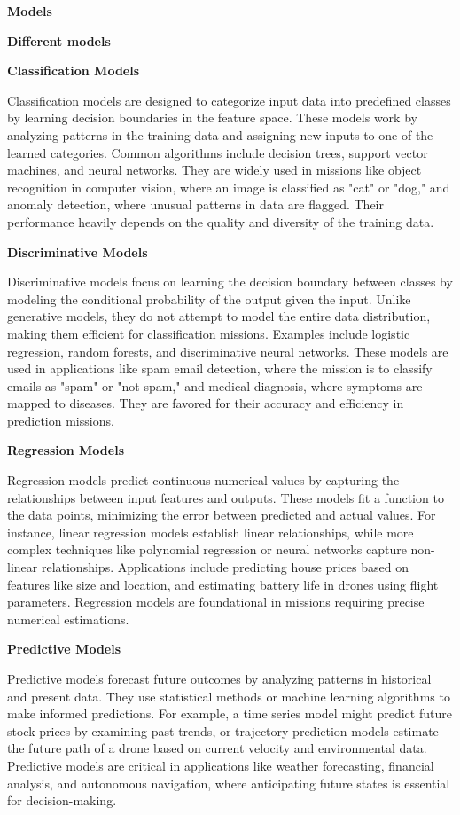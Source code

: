 \documentclass{book}
\providecommand{\ProjectDeepHeading}[2]{%
    \par\medskip\noindent\textbf{#2}\par\smallskip
}
\begin{document}

\ProjectDeepHeading{2}{Models}
\ProjectDeepHeading{3}{Different models}
\ProjectDeepHeading{4}{Classification Models}
Classification models are designed to categorize input data into predefined classes by learning decision boundaries in the feature space. These models work by analyzing patterns in the training data and assigning new inputs to one of the learned categories. Common algorithms include decision trees, support vector machines, and neural networks. They are widely used in missions like object recognition in computer vision, where an image is classified as "cat" or "dog," and anomaly detection, where unusual patterns in data are flagged. Their performance heavily depends on the quality and diversity of the training data.
    \ProjectDeepHeading{5}{Discriminative Models}
Discriminative models focus on learning the decision boundary between classes by modeling the conditional probability of the output given the input. Unlike generative models, they do not attempt to model the entire data distribution, making them efficient for classification missions. Examples include logistic regression, random forests, and discriminative neural networks. These models are used in applications like spam email detection, where the mission is to classify emails as "spam" or "not spam," and medical diagnosis, where symptoms are mapped to diseases. They are favored for their accuracy and efficiency in prediction missions.


\ProjectDeepHeading{4}{Regression Models}
Regression models predict continuous numerical values by capturing the relationships between input features and outputs. These models fit a function to the data points, minimizing the error between predicted and actual values. For instance, linear regression models establish linear relationships, while more complex techniques like polynomial regression or neural networks capture non-linear relationships. Applications include predicting house prices based on features like size and location, and estimating battery life in drones using flight parameters. Regression models are foundational in missions requiring precise numerical estimations.

\ProjectDeepHeading{4}{Predictive Models}
Predictive models forecast future outcomes by analyzing patterns in historical and present data. They use statistical methods or machine learning algorithms to make informed predictions. For example, a time series model might predict future stock prices by examining past trends, or trajectory prediction models estimate the future path of a drone based on current velocity and environmental data. Predictive models are critical in applications like weather forecasting, financial analysis, and autonomous navigation, where anticipating future states is essential for decision-making. 
\end{document}
